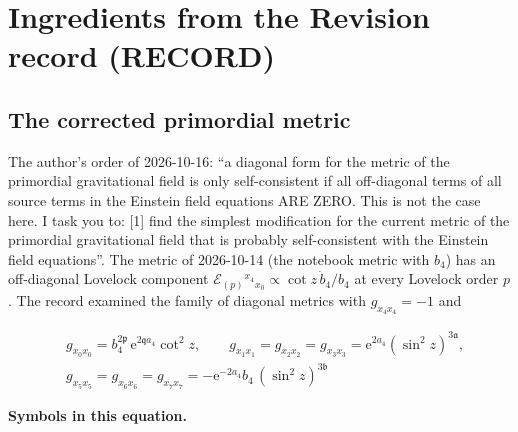 \documentclass[
  10pt,
]{article}
\begin{document}
\hypertarget{ingredients-from-the-revision-record-record}{%
\section{Ingredients from the Revision record
(RECORD)}\label{ingredients-from-the-revision-record-record}}

\hypertarget{the-corrected-primordial-metric}{%
\subsection{The corrected primordial
metric}\label{the-corrected-primordial-metric}}

The author's order of 2026-10-16: ``a diagonal form for the metric of
the primordial gravitational field is only self-consistent if all
off-diagonal terms of all source terms in the Einstein field equations
ARE ZERO. This is not the case here. I task you to: {[}1{]} find the
simplest modification for the current metric of the primordial
gravitational field that is probably self-consistent with the Einstein
field equations''. The metric of 2026-10-14 (the notebook metric with
\(b_4\)) has an off-diagonal Lovelock component
\(\mathcal{E}_{(p)}{}^{x_4}{}_{x_0} \propto \cot z\,\dot b_4/b_4\) at
every Lovelock order \(p\). The record examined the family of diagonal
metrics with \(g_{x_4x_4} = -1\) and

\[
\begin{aligned}
&g_{x_0x_0} = b_4^{2\mathfrak{p}}\,\mathrm{e}^{2\mathfrak{q}a_4}\cot^2z,\qquad
 g_{x_1x_1} = g_{x_2x_2} = g_{x_3x_3} = \mathrm{e}^{2a_4}(\sin^2z)^{3\mathfrak{a}},\\
&g_{x_5x_5} = g_{x_6x_6} = g_{x_7x_7} = -\mathrm{e}^{-2a_4}b_4\,(\sin^2z)^{3\mathfrak{b}}
\end{aligned}
\]

\textbf{Symbols in this equation.}
\end{document}
